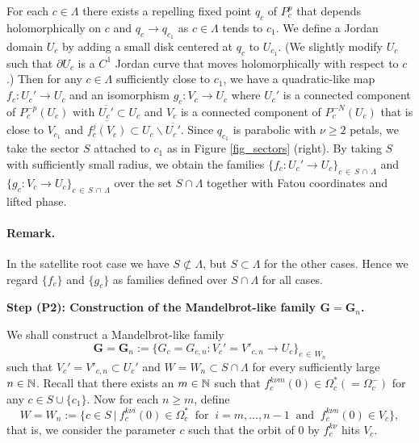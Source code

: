 For each $c \in \Lambda$ there exists a repelling fixed point $q_c$ of $P_{c}^{p}$ that depends holomorphically on $c$ and 
$q_c \to q_{c_1}$ as $c \in \Lambda$ tends to $c_1$.
We define a Jordan domain $U_c$ by adding 
a small disk centered at $q_c$ to $U_{c_1}$.
(We slightly modify $U_c$ such that 
$\partial U_c$ is a $C^1$ Jordan curve 
that moves holomorphically with respect to $c$.)
Then for any $c \in \Lambda$ sufficiently close to $c_1$,
we have a quadratic-like map $f_c:U_c' \to U_c$
and an isomorphism $g_c:V_c \to U_c$
where $U_c'$ is a connected component of $P_c^{-p}(U_c)$ 
with $\overline{U_c'} \subset U_c$
and $V_c$ is a connected component of $P_c^{-N}(U_c)$
that is close to $V_{c_1}$ and
$\overline{f_{c}^j(V_{c})} \subset U_{c} \smallsetminus \overline{U_{c}'}$. 
Since $q_{c_1}$ is parabolic with $\nu \ge 2$ petals,
we take the sector $S$ attached to $c_1$ as in Figure \ref{fig_sectors} (right).
By taking $S$ with sufficiently small radius, we obtain
the families $\{f_c:U_c' \to U_c\}_{c \,\in \,S \,\cap \,\Lambda}$ 
and $\{g_c:V_c \to U_c\}_{c \,\in \,S \,\cap\, \Lambda}$
over the set $S \cap \Lambda$ together with Fatou coordinates 
and lifted phase. 

\paragraph{\bf Remark.}
In the satellite root case we have $S \not\subset \Lambda$,
but $S \subset \Lambda$ for the other cases. 
Hence we regard $\{f_c\}$ and $\{g_c\}$ as families defined over $S \cap \Lambda$ for all cases.





\medskip






\noin
{\bf Step (P2): Construction of the Mandelbrot-like family 
$\boldsymbol{G} = \boldsymbol{G}_n$.} \ 

We shall construct a Mandelbrot-like family 
$$
\boldsymbol{G} = \boldsymbol{G}_n 
:= 
\{ G_c = G_{c,n} : V_c'=V'_{c,n} \to U_c 
   \}_{c \,\in\, W_n} 
$$
such that $V_c'=V'_{c,n} \subset U_c'$ and $W = W_n \subset S \cap \Lambda$ for 
every sufficiently large $n \in \mathbb N$. 
Recall that 
there exists an $m \in \mathbb N$
such that $f_{c}^{k\nu m}(0) \in \Omega_c^* ( = \Omega_c^-)$ 
for any $c \in S \cup \{c_1\}$.
Now for each $n \ge m$, define
$$
W = W_n 
:= 
\{ c \in S \ | \ f_c^{k\nu i}(0) \in \Omega_c^* \ \text{ for } \ i=m, \dots, n-1
\ \text{ and } \ 
  f_c^{k\nu n}(0) \in V_c \},
$$
that is, we consider the parameter $c$ such that the orbit of $0$
by $f_c^{k\nu}$ hits $V_c$.

